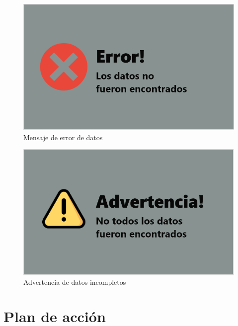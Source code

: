 \begin{figure}[H]
    \centering
    \includegraphics[scale=0.4]{Capitulo2/images/UI/11_error_datos.PNG}
    \caption{Mensaje de error de datos}
    \label{error_de_datos_notf}
\end{figure}
\begin{figure}[H]
    \centering
    \includegraphics[scale=0.4]{Capitulo2/images/UI/13_advertencia.PNG}
    \caption{Advertencia de datos incompletos}
    \label{advertencia}
\end{figure}

\section{Plan de acción}



\newpage 
